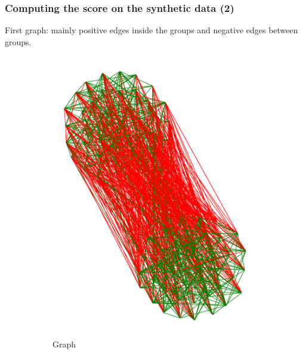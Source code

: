 \documentclass{beamer}
\begin{document}
\begin{frame}[c]
	\frametitle{Computing the score on the synthetic data (2)}
	First graph: mainly positive edges inside the groups and negative edges
	between groups.

	\begin{figure}
		\begin{center}
			\begin{subfigure}[b]{0.3\textwidth}
				\centering
				\includegraphics[width=\textwidth]{out/synthetic/graph1.pdf}
				\caption{Graph}
				\label{fig:}
			\end{subfigure}
			\begin{subfigure}[b]{0.3\textwidth}
				\centering

\end{subfigure}
\end{center}
\end{figure}
\end{frame}
\end{document}
